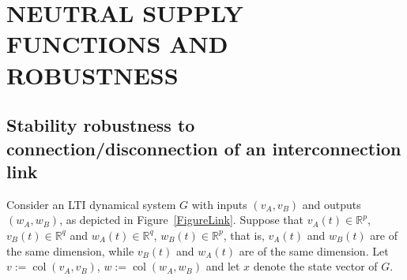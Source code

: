 \documentclass[11pt,a4paper,oneside,DIV=12,headings=small]{scrartcl}
\newcommand{\Rset}{\mathbb{R}}
\newcommand{\col}{\operatorname{col}}
\theoremstyle{plain}
\begin{document}
\section{NEUTRAL SUPPLY FUNCTIONS AND ROBUSTNESS}
\label{Sec5}


\subsection{Stability robustness to connection/disconnection of an interconnection link}

Consider an LTI dynamical system $G$ with inputs $(v_A,v_B)$ and outputs $(w_A,w_B)$, as depicted in Figure~\ref{FigureLink}. Suppose that $v_A(t)\in \Rset^p$, $v_B(t)\in \Rset^q$ and $w_A(t)\in \Rset^q$, $w_B(t)\in \Rset^p$, that is, $v_{A}(t)$ and $w_{B}(t)$ are of the same dimension, while $v_{B}(t)$ and $w_{A}(t)$ are of the same dimension. Let $v:=\col(v_{A},v_{B})$, $w:=\col(w_{A},w_{B})$ and let $x$ denote the state vector of $G$.
\end{document}

